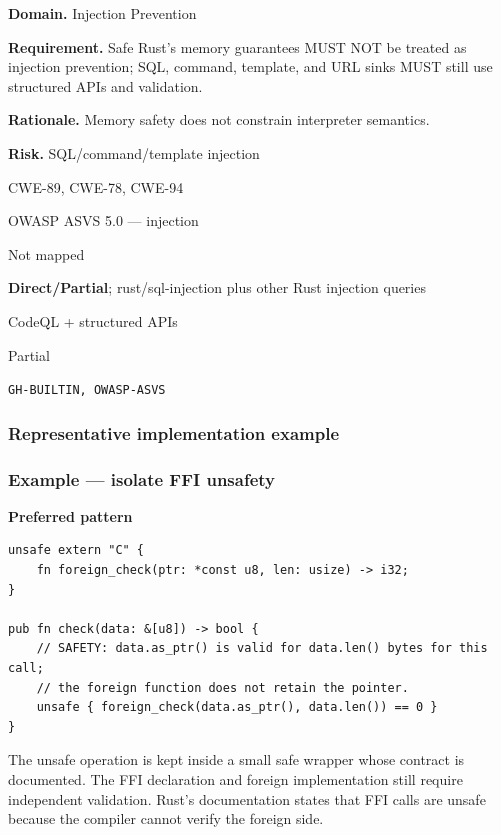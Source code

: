 \documentclass[10pt,letterpaper]{article}
\newcommand{\prioritybadge}[2]{\tcbox[on line,boxrule=0pt,arc=1.2mm,boxsep=0.7mm,left=1mm,right=1mm,top=0.4mm,bottom=0.4mm,colback=#2!12,coltext=#2]{\scriptsize\bfseries #1}}
\begin{document}
\begin{rulebox}[title={\texttt{SCS-RUST-INJ-001} \hfill \prioritybadge{Critical Control}{Critical}}]
\textbf{Domain.} Injection Prevention

\textbf{Requirement.} Safe Rust's memory guarantees MUST NOT be treated as injection prevention; SQL, command, template, and URL sinks MUST still use structured APIs and validation.

\textbf{Rationale.} Memory safety does not constrain interpreter semantics.

\textbf{Risk.} SQL/command/template injection

\begin{description}[leftmargin=2.65cm,labelwidth=2.3cm,style=nextline,itemsep=1pt,topsep=3pt]
  \item[CWE] CWE-89, CWE-78, CWE-94
  \item[OWASP] OWASP ASVS 5.0 --- injection
  \item[CERT] Not mapped
  \item[CodeQL] \textbf{Direct/Partial}; rust/sql-injection plus other Rust injection queries
  \item[Enforcement] CodeQL + structured APIs
  \item[Automation] Partial
  \item[Sources] \texttt{GH-BUILTIN, OWASP-ASVS}
\end{description}
\end{rulebox}
\subsubsection*{Representative implementation example}
\subsubsection*{Example --- isolate FFI unsafety}

\textbf{Preferred pattern}\par
\begin{lstlisting}
unsafe extern "C" {
    fn foreign_check(ptr: *const u8, len: usize) -> i32;
}

pub fn check(data: &[u8]) -> bool {
    // SAFETY: data.as_ptr() is valid for data.len() bytes for this call;
    // the foreign function does not retain the pointer.
    unsafe { foreign_check(data.as_ptr(), data.len()) == 0 }
}
\end{lstlisting}

The unsafe operation is kept inside a small safe wrapper whose contract is documented. The FFI declaration and foreign implementation still require independent validation. Rust's documentation states that FFI calls are unsafe because the compiler cannot verify the foreign side.\par
\end{document}
